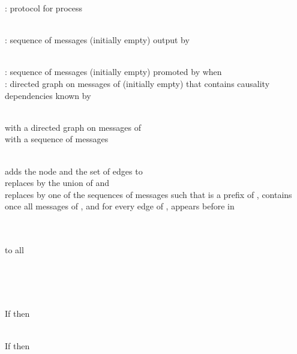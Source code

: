 \documentclass[11pt]{article}
\begin{document}
\begin{algorithm}[t]
\caption{: protocol for process }\label{algo:ETOB}
\footnotesize
\begin{description}\itemsep0pt

\item[Output variable:]~\\
: sequence of messages  (initially empty) output by 

\item[Internal variables:]~\\
: sequence of messages  (initially empty) promoted by  when \\
: directed graph on messages of  (initially empty) that contains causality dependencies known by 

\item[Messages:]~\\
  with  a directed graph on messages of \\
 with  a sequence of messages 

\item[Functions:]~\\
 adds the node  and the set of edges  to \\
 replaces  by the union of  and \\
 replaces  by one of the sequences of messages  such that  is a prefix of ,  contains once all messages of , and for every edge  of ,  appears before  in 

\item[On  from the application]~\\
\\
  to all

\item[On reception of  from ]~\\
\\


\item[On reception of  from ]~\\
If  then\\


\item[On local time out]~\\
If  then\\


\end{description}
\normalsize
\end{algorithm}
\end{document}
